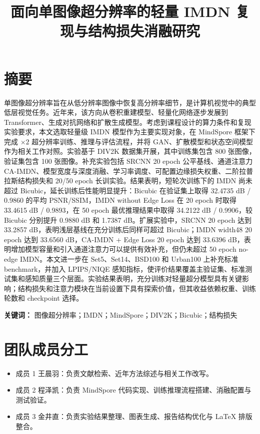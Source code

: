 \documentclass[bwprint]{report}
\title{面向单图像超分辨率的轻量 IMDN 复现与结构损失消融研究}
\begin{document}
\maketitle

\pagestyle{plain}
\tableofcontents
\newpage
\setcounter{page}{1}

\section*{摘要}
单图像超分辨率旨在从低分辨率图像中恢复高分辨率细节，是计算机视觉中的典型低层视觉任务。近年来，该方向从卷积重建模型、轻量化网络逐步发展到 Transformer、生成对抗网络和扩散生成模型。考虑到课程设计的算力条件和复现实验要求，本文选取轻量级 IMDN 模型作为主要实现对象，在 MindSpore 框架下完成 $\times 2$ 超分辨率训练、推理与评估流程，并将 GAN、扩散模型和状态空间模型作为相关工作对照。实验基于 DIV2K 数据集开展，其中训练集包含 800 张图像，验证集包含 100 张图像。补充实验包括 SRCNN 20 epoch 公平基线、通道注意力 CA-IMDN、模型宽度与深度消融、学习率调度、可配置边缘损失权重、二阶拉普拉斯结构损失和 20/50 epoch 长训实验。结果表明，短轮次训练下的 IMDN 尚未超过 Bicubic，延长训练后性能明显提升：Bicubic 在验证集上取得 32.4735 dB / 0.9860 的平均 PSNR/SSIM，IMDN without Edge Loss 在 20 epoch 时取得 33.4615 dB / 0.9893，在 50 epoch 最优推理结果中取得 34.2122 dB / 0.9906，较 Bicubic 分别提升 0.9880 dB 和 1.7387 dB。扩展实验中，SRCNN 20 epoch 达到 33.2857 dB，表明浅层基线在充分训练后同样可超过 Bicubic；IMDN width48 20 epoch 达到 33.6560 dB，CA-IMDN + Edge Loss 20 epoch 达到 33.6396 dB，表明增加模型容量和引入通道注意力可以提供有效补充，但仍未超过 50 epoch no-edge IMDN。本文进一步在 Set5、Set14、BSD100 和 Urban100 上补充标准 benchmark，并加入 LPIPS/NIQE 感知指标，使评价结果覆盖主验证集、标准测试集和感知质量三个层面。实验结果表明，充分训练对轻量超分模型具有关键影响；结构损失和注意力模块在当前设置下具有探索价值，但其收益依赖权重、训练轮数和 checkpoint 选择。

\noindent\textbf{关键词：} 图像超分辨率；IMDN；MindSpore；DIV2K；Bicubic；结构损失

\section{团队成员分工}
\begin{itemize}
    \item 成员 1 王晨羽：负责文献检索、近年方法综述与相关工作改写。
    \item 成员 2 程泽凯：负责 MindSpore 代码实现、训练推理流程搭建、消融配置与测试验证。
    \item 成员 3 金井直：负责实验结果整理、图表生成、报告结构优化与 \LaTeX{} 排版整合。
\end{itemize}
\end{document}
